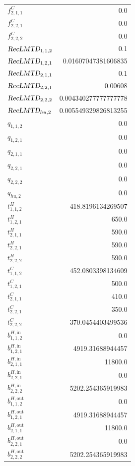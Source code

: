 \documentclass{article}%
\begin{document}
\begin{multicols*}{3}
\begin{supertabular}{lr}
	$f_{2,1,1}^{C}$ & 0.0 \\%
	$f_{2,2,1}^{C}$ & 0.0 \\%
	$f_{2,2,2}^{C}$ & 0.0 \\%
	$\textsl{RecLMTD}_{1,1,2}$ & 0.1 \\%
	$\textsl{RecLMTD}_{1,2,1}$ & 0.01607047381606835 \\%
	$\textsl{RecLMTD}_{2,1,1}$ & 0.1 \\%
	$\textsl{RecLMTD}_{2,2,1}$ & 0.00608 \\%
	$\textsl{RecLMTD}_{2,2,2}$ & 0.004340277777777778 \\%
	$\textsl{RecLMTD}_{hu,2}$ & 0.005549329826813255 \\%
	$q_{1,1,2}$ & 0.0 \\%
	$q_{1,2,1}$ & 0.0 \\%
	$q_{2,1,1}$ & 0.0 \\%
	$q_{2,2,1}$ & 0.0 \\%
	$q_{2,2,2}$ & 0.0 \\%
	$q_{hu,2}$ & 0.0 \\%
	$t_{1,1,2}^{H}$ & 418.8196134269507 \\%
	$t_{1,2,1}^{H}$ & 650.0 \\%
	$t_{2,1,1}^{H}$ & 590.0 \\%
	$t_{2,2,1}^{H}$ & 590.0 \\%
	$t_{2,2,2}^{H}$ & 590.0 \\%
	$t_{1,1,2}^{C}$ & 452.0803398134609 \\%
	$t_{1,2,1}^{C}$ & 500.0 \\%
	$t_{2,1,1}^{C}$ & 410.0 \\%
	$t_{2,2,1}^{C}$ & 350.0 \\%
	$t_{2,2,2}^{C}$ & 370.0454403499536 \\%
	$b_{1,1,2}^{H,\text{in}}$ & 0.0 \\%
	$b_{1,2,1}^{H,\text{in}}$ & 4919.31688944457 \\%
	$b_{2,1,1}^{H,\text{in}}$ & 11800.0 \\%
	$b_{2,2,1}^{H,\text{in}}$ & 0.0 \\%
	$b_{2,2,2}^{H,\text{in}}$ & 5202.254365919983 \\%
	$b_{1,1,2}^{H,\text{out}}$ & 0.0 \\%
	$b_{1,2,1}^{H,\text{out}}$ & 4919.31688944457 \\%
	$b_{2,1,1}^{H,\text{out}}$ & 11800.0 \\%
	$b_{2,2,1}^{H,\text{out}}$ & 0.0 \\%
	$b_{2,2,2}^{H,\text{out}}$ & 5202.254365919983 \\%

\end{supertabular}
\end{multicols*}
\end{document}
